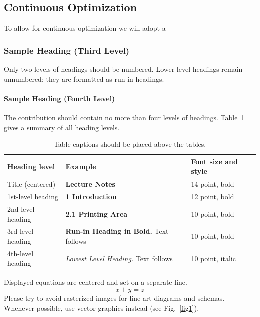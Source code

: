 \documentclass[runningheads]{llncs}
\begin{document}
\subsection{Continuous Optimization}
To allow for continuous optimization we will adopt a




\subsubsection{Sample Heading (Third Level)} Only two levels of
headings should be numbered. Lower level headings remain unnumbered;
they are formatted as run-in headings.

\paragraph{Sample Heading (Fourth Level)}
The contribution should contain no more than four levels of
headings. Table~\ref{tab1} gives a summary of all heading levels.

\begin{table}
\caption{Table captions should be placed above the
tables.}\label{tab1}
\begin{tabular}{|l|l|l|}
\hline
Heading level &  Example & Font size and style\\
\hline
Title (centered) &  {\Large\bfseries Lecture Notes} & 14 point, bold\\
1st-level heading &  {\large\bfseries 1 Introduction} & 12 point, bold\\
2nd-level heading & {\bfseries 2.1 Printing Area} & 10 point, bold\\
3rd-level heading & {\bfseries Run-in Heading in Bold.} Text follows & 10 point, bold\\
4th-level heading & {\itshape Lowest Level Heading.} Text follows & 10 point, italic\\
\hline
\end{tabular}
\end{table}


\noindent Displayed equations are centered and set on a separate
line.
\begin{equation}
x + y = z
\end{equation}
Please try to avoid rasterized images for line-art diagrams and
schemas. Whenever possible, use vector graphics instead (see
Fig.~\ref{fig1}).
\end{document}
